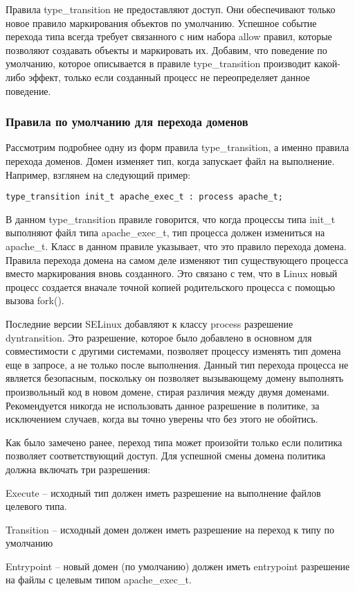 \documentclass{./../class/UIR}
\begin{document}
Правила type\_transition не предоставляют доступ. Они обеспечивают только новое
правило маркирования объектов по умолчанию. Успешное событие перехода типа
всегда требует связанного с ним набора allow правил, которые позволяют создавать
объекты и маркировать их. Добавим, что поведение по умолчанию, которое
описывается в правиле type\_transition производит какой-либо эффект, только если
созданный процесс не переопределяет данное поведение.

\subsubsection{Правила по умолчанию для перехода доменов}

Рассмотрим подробнее одну из форм правила type\_transition, а именно правила
перехода доменов. Домен изменяет тип, когда запускает файл на выполнение.
Например, взглянем на следующий пример:

\begin{verbatim}
type_transition init_t apache_exec_t : process apache_t;
\end{verbatim}

В данном type\_transition правиле говорится, что когда процессы типа init\_t
выполняют файл типа apache\_exec\_t, тип процесса должен измениться на
apache\_t. Класс в данном правиле указывает, что это правило перехода домена.
Правила перехода домена на самом деле изменяют тип существующего процесса вместо
маркирования вновь созданного. Это связано с тем, что в Linux новый процесс
создается вначале точной копией родительского процесса с помощью вызова fork().

Последние версии SELinux добавляют к классу process разрешение dyntransition.
Это разрешение, которое было добавлено в основном для совместимости с другими
системами, позволяет процессу изменять тип домена еще в запросе, а не только
после выполнения. Данный тип перехода процесса не является безопасным, поскольку
он позволяет вызывающему домену выполнять произвольный код в новом домене,
стирая различия между двумя доменами. Рекомендуется никогда не использовать
данное разрешение в политике, за исключением случаев, когда вы точно уверены что
без этого не обойтись.

Как было замечено ранее, переход типа может произойти только если политика
позволяет соответствующий доступ. Для успешной смены домена политика должна
включать три разрешения:
\begin{description}
\item Execute – исходный тип должен иметь разрешение на выполнение файлов
целевого типа.
\item Transition – исходный домен должен иметь разрешение на переход к типу по
умолчанию 
\item Entrypoint – новый домен (по умолчанию) должен иметь entrypoint разрешение
на файлы с целевым типом apache\_exec\_t.
\end{description}
\end{document}
